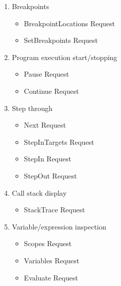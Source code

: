 \documentclass{article}
\begin{document}
\begin{appendices}
    \begin{enumerate}
        \item Breakpoints
            \begin{itemize}
                \item BreakpointLocations Request
                \item SetBreakpoints Request
            \end{itemize}
        \item Program execution start/stopping
            \begin{itemize}
                \item Pause Request
                \item Continue Request
            \end{itemize}
        \item Step through
            \begin{itemize}
                \item Next Request
                \item StepInTargets Request
                \item StepIn Request
                \item StepOut Request
            \end{itemize}
        \item Call stack display
            \begin{itemize}
                \item StackTrace Request
            \end{itemize}
        \item Variable/expression inspection
            \begin{itemize}
                \item Scopes Request
                \item Variables Request
                \item Evaluate Request
            \end{itemize}
    \end{enumerate}
    \label{app:further-dap}

\end{appendices}
\end{document}
